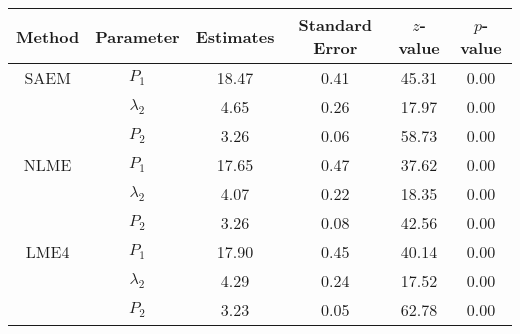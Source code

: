 \begin{table}[ht]
\centering
\begin{tabular}{cccccc}
  \hline
Method & Parameter & Estimates & Standard Error & $z$-value & $p$-value \\ 
  \hline
SAEM & $P_1$ & 18.47 & 0.41 & 45.31 & 0.00 \\ 
   & $\lambda_2$ & 4.65 & 0.26 & 17.97 & 0.00 \\ 
   & $P_2$ & 3.26 & 0.06 & 58.73 & 0.00 \\ 
  NLME & $P_1$ & 17.65 & 0.47 & 37.62 & 0.00 \\ 
   & $\lambda_2$ & 4.07 & 0.22 & 18.35 & 0.00 \\ 
   & $P_2$ & 3.26 & 0.08 & 42.56 & 0.00 \\ 
  LME4 & $P_1$ & 17.90 & 0.45 & 40.14 & 0.00 \\ 
   & $\lambda_2$ & 4.29 & 0.24 & 17.52 & 0.00 \\ 
   & $P_2$ & 3.23 & 0.05 & 62.78 & 0.00 \\ 
   \hline
\end{tabular}
\end{table}
